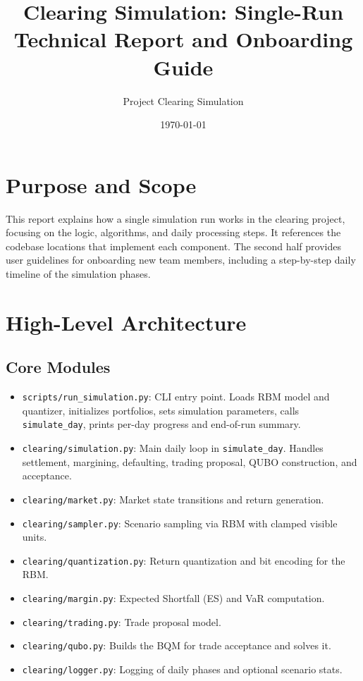 \documentclass[11pt]{article}
\title{Clearing Simulation: Single-Run Technical Report and Onboarding Guide}
\author{Project Clearing Simulation}
\date{\today}
\begin{document}
\maketitle

\section{Purpose and Scope}
This report explains how a single simulation run works in the clearing project,
focusing on the logic, algorithms, and daily processing steps. It references the
codebase locations that implement each component. The second half provides
user guidelines for onboarding new team members, including a step-by-step daily
timeline of the simulation phases.

\section{High-Level Architecture}
\subsection{Core Modules}
\begin{itemize}[leftmargin=*]
  \item \texttt{scripts/run\_simulation.py}: CLI entry point. Loads RBM model and quantizer,
  initializes portfolios, sets simulation parameters, calls \texttt{simulate\_day}, prints
  per-day progress and end-of-run summary.
  \item \texttt{clearing/simulation.py}: Main daily loop in \texttt{simulate\_day}. Handles
  settlement, margining, defaulting, trading proposal, QUBO construction, and acceptance.
  \item \texttt{clearing/market.py}: Market state transitions and return generation.
  \item \texttt{clearing/sampler.py}: Scenario sampling via RBM with clamped visible units.
  \item \texttt{clearing/quantization.py}: Return quantization and bit encoding for the RBM.
  \item \texttt{clearing/margin.py}: Expected Shortfall (ES) and VaR computation.
  \item \texttt{clearing/trading.py}: Trade proposal model.
  \item \texttt{clearing/qubo.py}: Builds the BQM for trade acceptance and solves it.
  \item \texttt{clearing/logger.py}: Logging of daily phases and optional scenario stats.
\end{itemize}
\end{document}
